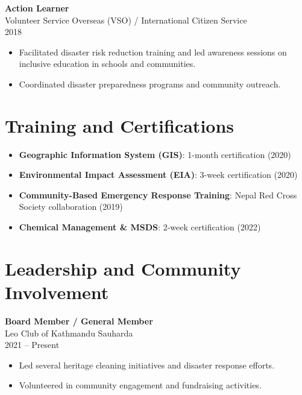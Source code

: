 \documentclass[a4paper,10pt]{article}
\begin{document}
\vspace{0.2cm}

\noindent
\textbf{Action Learner} \\
Volunteer Service Overseas (VSO) / International Citizen Service \\
2018 \\
\begin{itemize}[noitemsep]
    \item Facilitated disaster risk reduction training and led awareness sessions on inclusive education in schools and communities.
    \item Coordinated disaster preparedness programs and community outreach.
\end{itemize}

\vspace{0.3cm}

\section*{Training and Certifications}
\begin{itemize}[noitemsep]
    \item \textbf{Geographic Information System (GIS)}: 1-month certification (2020)
    \item \textbf{Environmental Impact Assessment (EIA)}: 3-week certification (2020)
    \item \textbf{Community-Based Emergency Response Training}: Nepal Red Cross Society collaboration (2019)
    \item \textbf{Chemical Management \& MSDS}: 2-week certification (2022)
\end{itemize}

\vspace{0.3cm}

\section*{Leadership and Community Involvement}
\noindent
\textbf{Board Member / General Member} \\
Leo Club of Kathmandu Sauharda \\
2021 – Present \\
\begin{itemize}[noitemsep]
    \item Led several heritage cleaning initiatives and disaster response efforts.
    \item Volunteered in community engagement and fundraising activities.
\end{itemize}
\end{document}
